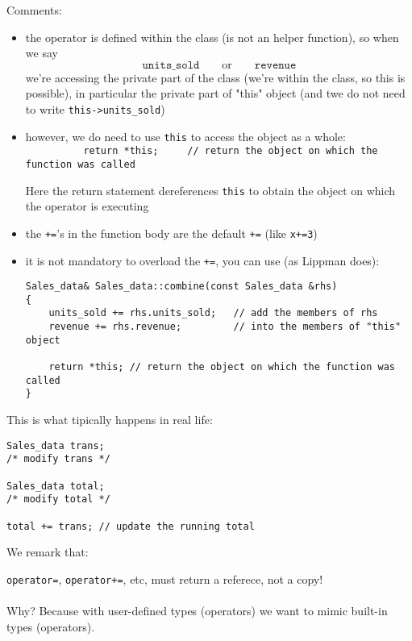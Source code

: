 Comments:
\begin{itemize}
    \item the operator is defined within the class (is not an helper function), so when we say
    \begin{equation*}
    \texttt{units\_sold}\qquad\text{or}\qquad \texttt{revenue}
    \end{equation*}
    we're accessing the private part of the class (we're within the class, so this is possible), in particular the private part of "this" object (and twe do not need to write \texttt{this->units\_sold}) 

    \item[\huge\danger] however, we do need to use \texttt{this} to access the object as a whole: \\
    \lstinline|          return *this;     // return the object on which the function was called|

    Here the return statement dereferences \texttt{this} to obtain the object on which the operator is executing

    \item the \texttt{+=}'s in the function body are the default \texttt{+=} (like \texttt{x+=3})

    \item it is not mandatory to overload the \texttt{+=}, you can use (as Lippman does):
    \begin{lstlisting}
Sales_data& Sales_data::combine(const Sales_data &rhs)
{
    units_sold += rhs.units_sold;   // add the members of rhs
    revenue += rhs.revenue;         // into the members of "this" object

    return *this; // return the object on which the function was called
}
\end{lstlisting}
\end{itemize}

This is what tipically happens in real life:
\begin{lstlisting}
Sales_data trans;
/* modify trans */

Sales_data total;
/* modify total */

total += trans; // update the running total
\end{lstlisting}


We remark that:
\begin{marker}
\texttt{operator=}, \texttt{operator+=}, etc, must return a referece, not a copy! 
\\
\\
Why? Because with user-defined types (operators) we want to mimic built-in types (operators).
\end{marker}

